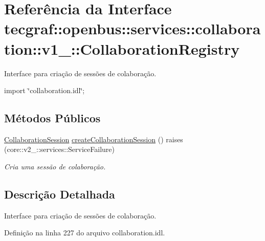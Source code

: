 \hypertarget{interfacetecgraf_1_1openbus_1_1services_1_1collaboration_1_1v1__0_1_1CollaborationRegistry}{\section{\-Referência da \-Interface tecgraf\-:\-:openbus\-:\-:services\-:\-:collaboration\-:\-:v1\-\_\-:\-:\-Collaboration\-Registry}
\label{interfacetecgraf_1_1openbus_1_1services_1_1collaboration_1_1v1__0_1_1CollaborationRegistry}
}


\-Interface para criação de sessões de colaboração.  




{\ttfamily import \char`\"{}collaboration.\-idl\char`\"{};}

\subsection*{\-Métodos \-Públicos}
\begin{DoxyCompactItemize}
\item 
\hyperlink{interfacetecgraf_1_1openbus_1_1services_1_1collaboration_1_1v1__0_1_1CollaborationSession}{\-Collaboration\-Session} \hyperlink{interfacetecgraf_1_1openbus_1_1services_1_1collaboration_1_1v1__0_1_1CollaborationRegistry_a860bdbfcca2516f6bcf9945b57339cb1}{create\-Collaboration\-Session} ()  raises (core\-::v2\-\_\-::services\-::\-Service\-Failure)
\begin{DoxyCompactList}\small\item\em \-Cria uma sessão de colaboração. \end{DoxyCompactList}\end{DoxyCompactItemize}


\subsection{\-Descrição \-Detalhada}
\-Interface para criação de sessões de colaboração. 

\-Definição na linha 227 do arquivo collaboration.\-idl.




